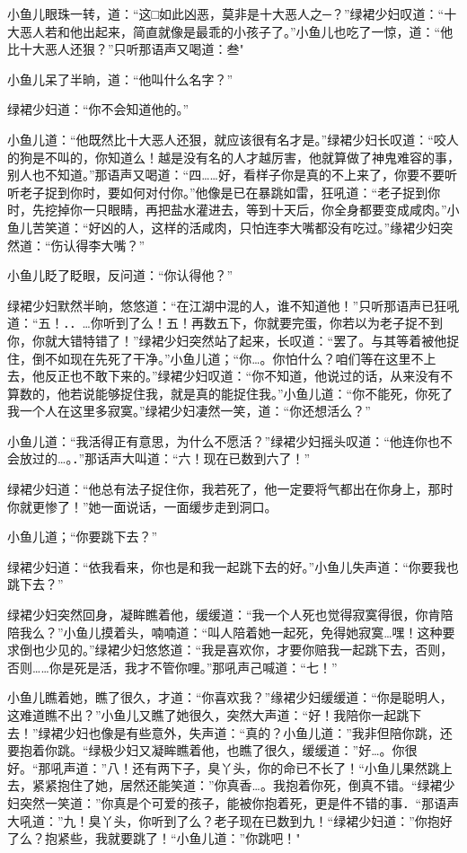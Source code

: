 \documentclass[12pt,oneside]{book}
\begin{document}
小鱼儿眼珠一转，道：``这□如此凶恶，莫非是十大恶人之─？''绿裙少妇叹道：``十大恶人若和他出起来，简直就像是最乖的小孩子了。''小鱼儿也吃了一惊，道：``他比十大恶人还狠？''只听那语声又喝道：叁"

小鱼儿呆了半晌，道：``他叫什么名字？''

绿裙少妇道：``你不会知道他的。''

小鱼儿道：``他既然比十大恶人还狠，就应该很有名才是。''绿裙少妇长叹道：``咬人的狗是不叫的，你知道么！越是没有名的人才越厉害，他就算做了神鬼难容的事，别人也不知道。''那语声又喝道：``四\ldots\ldots 好，看样子你是真的不上来了，你要不要听听老子捉到你时，要如何对付你。''他像是已在暴跳如雷，狂吼道：``老子捉到你时，先挖掉你一只眼睛，再把盐水灌进去，等到十天后，你全身都要变成咸肉。''小鱼儿苦笑道：``好凶的人，这样的活咸肉，只怕连李大嘴都没有吃过。''缘裙少妇突然道：``伤认得李大嘴？''

小鱼儿眨了眨眼，反问道：``你认得他？''

绿裙少妇默然半晌，悠悠道：``在江湖中混的人，谁不知道他！''只听那语声已狂吼道：``五！．．\ldots 你听到了么！五！再数五下，你就要完蛋，你若以为老子捉不到你，你就大错特错了！''绿裙少妇突然站了起来，长叹道：``罢了。与其等着被他捉住，倒不如现在先死了干净。''小鱼儿道；``你\ldots。你怕什么？咱们等在这里不上去，他反正也不敢下来的。''绿裙少妇叹道：``你不知道，他说过的话，从来没有不算数的，他若说能够捉住我，就是真的能捉住我。''小鱼儿道：``你不能死，你死了我一个人在这里多寂寞。''绿裙少妇凄然一笑，道：``你还想活么？''

小鱼儿道：``我活得正有意思，为什么不愿活？''绿裙少妇摇头叹道：``他连你也不会放过的\ldots。．''那话声大叫道：``六！现在已数到六了！''

绿裙少妇道：``他总有法子捉住你，我若死了，他一定要将气都出在你身上，那时你就更惨了！''她一面说话，一面缓步走到洞口。

小鱼儿道；``你要跳下去？''

绿裙少妇道：``依我看来，你也是和我一起跳下去的好。''小鱼儿失声道：``你要我也跳下去？''

绿裙少妇突然回身，凝眸瞧着他，缓缓道：``我一个人死也觉得寂寞得很，你肯陪陪我么？''小鱼儿摸着头，喃喃道：``叫人陪着她一起死，免得她寂寞\ldots 嘿！这种要求倒也少见的。''绿裙少妇悠悠道：``我是喜欢你，才要你赔我一起跳下去，否则，否则\ldots\ldots 你是死是活，我才不管你哩。''那吼声己喊道：``七！''

小鱼儿瞧着她，瞧了很久，才道：``你喜欢我？''缘裙少妇缓缓道：``你是聪明人，这难道瞧不出？''小鱼儿又瞧了她很久，突然大声道：``好！我陪你一起跳下去！''绿裙少妇也像是有些意外，失声道：``真的？小鱼儿道：''我非但陪你跳，还要抱着你跳。``绿极少妇又凝眸瞧着他，也瞧了很久，缓缓道：''好\ldots。你很好。``那吼声道：''八！还有两下子，臭丫头，你的命已不长了！``小鱼儿果然跳上去，紧紧抱住了她，居然还能笑道：''你真香\ldots。我抱着你死，倒真不错。``绿裙少妇突然一笑道：''你真是个可爱的孩子，能被你抱着死，更是件不错的事．``那语声大吼道：''九！臭丫头，你听到了么？老子现在已数到九！``绿裙少妇道：''你抱好了么？抱紧些，我就要跳了！``小鱼儿道：''你跳吧！"
\end{document}
